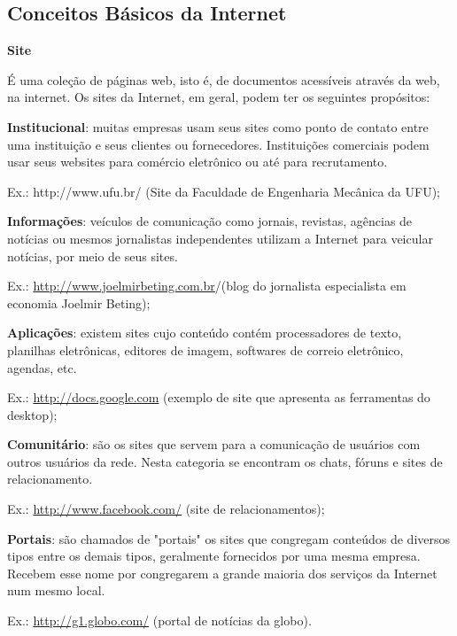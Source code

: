 \documentclass[hidelinks,12pt]{article}
\begin{document}
		\subsection{Conceitos Básicos da Internet}
		
		\textbf{Site}
		
		É uma coleção de páginas web, isto é, de documentos acessíveis através da web, na internet. Os sites da Internet, em geral, podem ter os seguintes propósitos:

		\textbf{Institucional}: muitas empresas usam seus sites como ponto de contato entre uma instituição e seus clientes ou fornecedores. Instituições comerciais podem usar seus websites para comércio eletrônico ou até para recrutamento. 
		
		Ex.: http://www.ufu.br/ (Site da Faculdade de Engenharia Mecânica da UFU);
		
		
		\textbf{Informações}: veículos de comunicação como jornais, revistas, agências de notícias ou mesmos jornalistas independentes utilizam a Internet para veicular notícias, por meio de seus sites. 
		
		Ex.: \url{http://www.joelmirbeting.com.br}/(blog do jornalista especialista em economia Joelmir Beting);
		
		
		\textbf{Aplicações}: existem sites cujo conteúdo contém processadores de texto, planilhas eletrônicas, editores de imagem, softwares de correio eletrônico, agendas, etc. 
		
		Ex.: \url{http://docs.google.com} (exemplo de site que apresenta as ferramentas do desktop);
		
		
		\textbf{Comunitário}: são os sites que servem para a comunicação de usuários com outros usuários da rede. Nesta categoria se encontram os chats, fóruns e sites de relacionamento. 
		
		Ex.: \url{http://www.facebook.com/} (site de relacionamentos);
		
		
		\textbf{Portais}: são chamados de "portais" os sites que congregam conteúdos de diversos tipos entre os demais tipos, geralmente fornecidos por uma mesma empresa. Recebem esse nome por congregarem a grande maioria dos serviços da Internet num mesmo local. 
		
		Ex.: \url{http://g1.globo.com/} (portal de notícias da globo).
				
	
\end{document}
